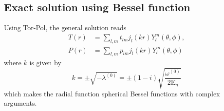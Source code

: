 \subsection{Exact solution using Bessel function}

Using Tor-Pol, the general solution reads
%
\begin{equation}
\begin{aligned}
    T(r) &= \sum_{l,m} t_{lm} j_l(kr) Y_l^m(\theta, \phi), \\
    P(r) &= \sum_{l,m} p_{lm} j_l(kr) Y_l^m(\theta, \phi)
\end{aligned}
\end{equation}
%
where $k$ is given by
%
\begin{equation}
    k = \pm \sqrt{-\lambda^{(0)}} = \pm (1 - i) \sqrt{\frac{\omega^{(0)}}{2\mathrm{E}_\eta}}
\end{equation}
%
which makes the radial function spherical Bessel functions with complex arguments.



